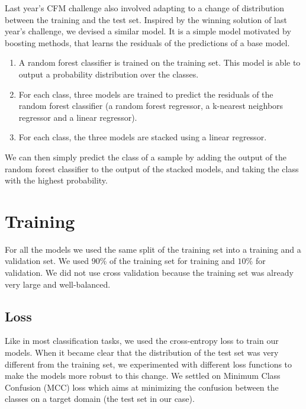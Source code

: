 \documentclass[switch, 11pt]{article}
\begin{document}
\begin{multicols}{2}
    Last year's CFM challenge also involved adapting to a change of distribution between the training and the test set. Inspired by the winning solution of last year's challenge, we devised a similar model. It is a simple model motivated by boosting methods, that learns the residuals of the predictions of a base model.
    \begin{enumerate}
        \item A random forest classifier is trained on the training set. This model is able to output a probability distribution over the classes.
        \item For each class, three models are trained to predict the residuals of the random forest classifier (a random forest regressor, a k-nearest neighbors regressor and a linear regressor).
        \item For each class, the three models are stacked using a linear regressor.
    \end{enumerate}

    We can then simply predict the class of a sample by adding the output of the random forest classifier to the output of the stacked models, and taking the class with the highest probability.

    \section{Training}

    For all the models we used the same split of the training set into a training and a validation set. We used $90\%$ of the training set for training and $10\%$ for validation. We did not use cross validation because the training set was already very large and well-balanced.

    \subsection{Loss}
    Like in most classification tasks, we used the cross-entropy loss to train our models. When it became clear that the distribution of the test set was very different from the training set, we experimented with different loss functions to make the models more robust to this change. We settled on Minimum Class Confusion (MCC) loss \cite{jin-2020} which aims at minimizing the confusion between the classes on a target domain (the test set in our case).


\end{multicols}
\end{document}
